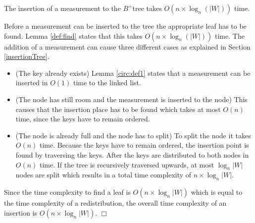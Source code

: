 \documentclass[abstracton,12pt,oneside]{scrreprt}
\newenvironment{proof}
  {\noindent{\bf Proof:\rm}}{\hfill$\Box$\vspace{\medskipamount}}
\begin{document}
\begin{mydef}
	The insertion of a measurement to the $B^+$tree takes $O(n \times \log_{n}(|W|))$ time.
\end{mydef}
\begin{proof}
	Before a measurement can be inserted to the tree the appropriate leaf has to be found. Lemma \ref{def:find} states that this takes $O(n \times \log_{n}(|W|))$ time.
	The addition of a measurement can cause three different cases as explained in Section \ref{insertionTree}. 
	\begin{itemize}
		\item (The key already exists) Lemma \ref{circ:def1} states that a measurement can be inserted in $O(1)$ time to the linked list. 
		\item (The node has still room and the measurement is inserted to the node)
		This causes that the insertion place has to be found which takes at most $O(n)$ time, since the keys have to remain ordered. 
		\item (The node is already full and the node has to split) To split the node it takes $O(n)$ time. Because the keys have to remain ordered, the insertion point is found by traversing the keys. After the keys are distributed to both nodes in $O(n)$ time. If the tree is recursively traversed upwards, at most $\log_{n}|W|$ nodes are split which results in a total time complexity of $n \times \log_{n}|W|$.
	\end{itemize}
	Since the time complexity to find a leaf is $O(n \times \log_{n}|W|)$ which is equal to the time complexity of a redistribution, the overall time complexity of an insertion is $O(n \times \log_{n}|W|)$.
\end{proof}
\end{document}

